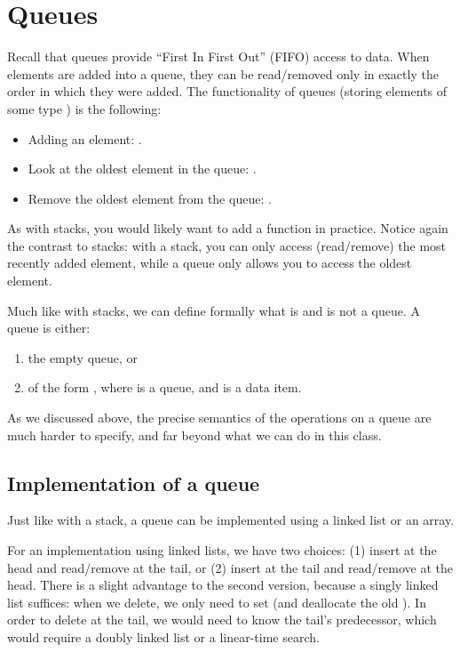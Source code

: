 \section{Queues}

Recall that queues provide ``First In First Out'' (FIFO) access to data. 
When elements are added into a queue, they can be read/removed only in
exactly the order in which they were added.
The functionality of queues (storing elements of some type )
is the following:

\begin{itemize}
\item Adding an element: 
.
\item Look at the oldest element in the queue: 
.
\item Remove the oldest element from the queue:
.
\end{itemize}

As with stacks, you would likely want to add a function 
in practice.
Notice again the contrast to stacks: with a stack,
you can only access (read/remove) the most recently added element,
while a queue only allows you to access the oldest element.

Much like with stacks, we can define formally what is and is not a queue.
A queue is either:
\begin{enumerate}
\item the empty queue, or
\item of the form , where  is a queue,
  and  is a data item.
\end{enumerate}

As we discussed above, the precise semantics of the operations on a
queue are much harder to specify, and far beyond what we can do in
this class.

\subsection{Implementation of a queue}
Just like with a stack,
a queue can be implemented using a linked list or an array.

For an implementation using linked lists, we have two choices: 
(1) insert at the head and read/remove at the tail, or
(2) insert at the tail and read/remove at the head.
There is a slight advantage to the second version,
because a singly linked list suffices:
when we delete, we only need to set
 (and deallocate the old ).
In order to delete at the tail, we would need to know the tail's
predecessor,
which would require a doubly linked list or a linear-time search.

